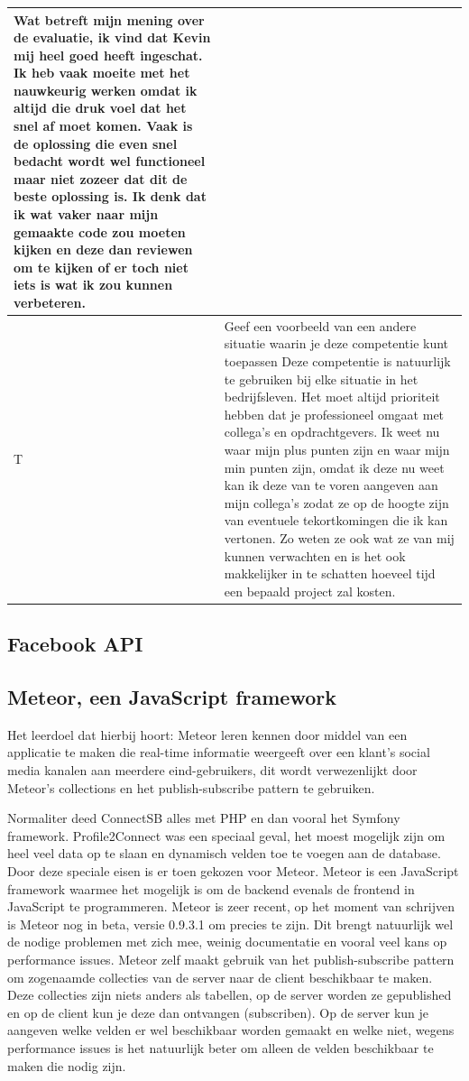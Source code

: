 \begin{tabularx}{\textwidth}{| l | X |}
Wat betreft mijn mening over de evaluatie, ik vind dat Kevin mij heel goed heeft ingeschat. Ik heb vaak moeite met het nauwkeurig werken omdat ik altijd die druk voel dat het snel af moet komen. Vaak is de oplossing die even snel bedacht wordt wel functioneel maar niet zozeer dat dit de beste oplossing is. Ik denk dat ik wat vaker naar mijn gemaakte code zou moeten kijken en deze dan reviewen om te kijken of er toch niet iets is wat ik zou kunnen verbeteren.
\\
\hline
T & Geef een voorbeeld van een andere situatie waarin je deze competentie kunt toepassen
\newline
\newline
Deze competentie is natuurlijk te gebruiken bij elke situatie in het bedrijfsleven. Het moet altijd prioriteit hebben dat je professioneel omgaat met collega's en opdrachtgevers. Ik weet nu waar mijn plus punten zijn en waar mijn min punten zijn, omdat ik deze nu weet kan ik deze van te voren aangeven aan mijn collega's zodat ze op de hoogte zijn van eventuele tekortkomingen die ik kan vertonen. Zo weten ze ook wat ze van mij kunnen verwachten en is het ook makkelijker in te schatten hoeveel tijd een bepaald project zal kosten.
\\
\hline
\end{tabularx}

\subsection{Facebook API}

\clearpage

\subsection{Meteor, een JavaScript framework}
Het leerdoel dat hierbij hoort: Meteor leren kennen door middel van een applicatie te maken die real-time informatie weergeeft over een klant’s social media kanalen aan meerdere eind-gebruikers, dit wordt verwezenlijkt door Meteor’s collections en het publish-subscribe pattern te gebruiken.

Normaliter deed ConnectSB alles met PHP en dan vooral het Symfony framework. Profile2Connect was een speciaal geval, het moest mogelijk zijn om heel veel data op te slaan en dynamisch velden toe te voegen aan de database. Door deze speciale eisen is er toen gekozen voor Meteor. Meteor is een JavaScript framework waarmee het mogelijk is om de backend evenals de frontend in JavaScript te programmeren. Meteor is zeer recent, op het moment van schrijven is Meteor nog in beta, versie 0.9.3.1 om precies te zijn. Dit brengt natuurlijk wel de nodige problemen met zich mee, weinig documentatie en vooral veel kans op performance issues. Meteor zelf maakt gebruik van het publish-subscribe pattern om zogenaamde collecties van de server naar de client beschikbaar te maken. Deze collecties zijn niets anders als tabellen, op de server worden ze gepublished en op de client kun je deze dan ontvangen (subscriben). Op de server kun je aangeven welke velden er wel beschikbaar worden gemaakt en welke niet, wegens performance issues is het natuurlijk beter om alleen de velden beschikbaar te maken die nodig zijn.

